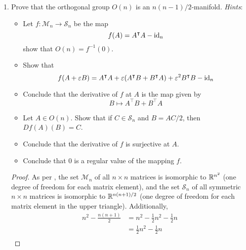 \documentclass[../psets.tex]{subfiles}
\begin{document}
\begin{enumerate}[label={\textbf{4.1.\roman*.}}]
    \begin{proof}
        It's clear that $\gamma_g$ is a $C^\infty$ map since each of its components are $C^\infty$. It is a diffeomorphism since it's inverse is the map $\pi:\gamma_g\to\R^n$ given by $\pi(x,g(x))=x$, which is also clearly $C^\infty$.
    \end{proof}
    \item Prove that the orthogonal group $O(n)$ is an $n(n-1)/2$-manifold. \emph{Hints}:
    \begin{itemize}[label={\scriptsize$\blacktriangleright$}]
        \item Let $f:\mathcal{M}_n\to\mathcal{S}_n$ be the map
        \begin{equation*}
            f(A) = A^\intercal A-\operatorname{id}_n
        \end{equation*}
        show that $O(n)=f^{-1}(0)$.
        \item Show that
        \begin{equation*}
            f(A+\varepsilon B) = A^\intercal A+\varepsilon(A^\intercal B+B^\intercal A)+\varepsilon^2B^\intercal B-\operatorname{id}_n
        \end{equation*}
        \item Conclude that the derivative of $f$ at $A$ is the map given by
        \begin{equation*}
            B \mapsto A^\intercal B+B^\intercal A
        \end{equation*}
        \item Let $A\in O(n)$. Show that if $C\in\mathcal{S}_n$ and $B=AC/2$, then $Df(A)(B)=C$.
        \item Conclude that the derivative of $f$ is surjective at $A$.
        \item Conclude that 0 is a regular value of the mapping $f$.
    \end{itemize}
    \begin{proof}
        As per \textcite[100]{bib:DifferentialForms}, the set $\mathcal{M}_n$ of all $n\times n$ matrices is isomorphic to $\mathbb{R}^{n^2}$ (one degree of freedom for each matrix element), and the set $\mathcal{S}_n$ of all symmetric $n\times n$ matrices is isomorphic to $\mathbb{R}^{n(n+1)/2}$ (one degree of freedom for each matrix element in the upper triangle). Additionally,
        \begin{align*}
            n^2-\frac{n(n+1)}{2} &= n^2-\frac{1}{2}n^2-\frac{1}{2}n\\
            &= \frac{1}{2}n^2-\frac{1}{2}n\\

\end{align*}
\end{proof}
\end{enumerate}
\end{document}
